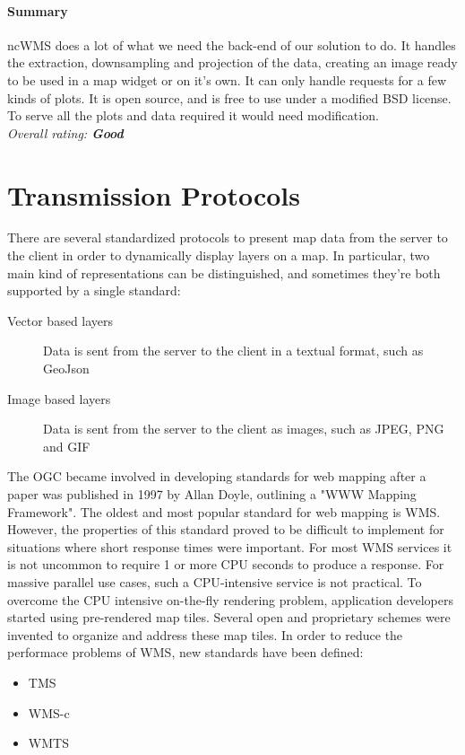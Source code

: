 \documentclass[11pt,a4paper,titlepage,oneside]{report}
\begin{document}
    \paragraph{Summary}
    ncWMS does a lot of what we need the \gls{back-end} of our solution to do. It handles the extraction, downsampling and projection of the data, creating an image ready to be used in a map widget or on it's own. It can only handle requests for a few kinds of plots. It is \gls{open source}, and is free to use under a modified \gls{BSD} license. To serve all the plots and data required it would need modification.
  \\ \emph{Overall rating: \textbf{Good}}

\section{Transmission Protocols}
  There are several standardized \glspl{protocol} to present map data from the server to the client in order to dynamically display layers on a map.
  In particular, two main kind of representations can be distinguished, and sometimes they're both supported by a single standard:
  \begin{description}
    \item[Vector based layers] Data is sent from the server to the client in a textual format, such as GeoJson
    \item[Image based layers] Data is sent from the server to the client as images, such as \gls{JPEG}, \gls{PNG} and \gls{GIF}
  \end{description}

  The \acrfull{OGC} became involved in developing standards for web mapping after a paper was published in 1997 by Allan Doyle, outlining a "WWW Mapping Framework". The oldest and most popular standard for web mapping is \gls{WMS}. However, the properties of this standard proved to be difficult to implement for situations where short response times were important. For most \gls{WMS} services it is not uncommon to require 1 or more \gls{CPU} seconds to produce a response. For massive parallel use cases, such a \gls{CPU}-intensive service is not practical. To overcome the \gls{CPU} intensive on-the-fly rendering problem, application developers started using pre-rendered map tiles. Several open and proprietary schemes were invented to organize and address these map tiles. 
  In order to reduce the performace problems of \gls{WMS}, new standards have been defined:
  \begin{itemize}
    \item TMS
    \item WMS-c
    \item WMTS
  \end{itemize}
  
\end{document}
